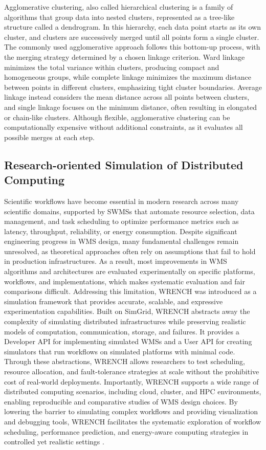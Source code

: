 Agglomerative clustering, also called hierarchical clustering is a family of algorithms that group data into nested clusters, represented as a tree-like structure called a dendrogram. In this hierarchy, each data point starts as its own cluster, and clusters are successively merged until all points form a single cluster. The commonly used agglomerative approach follows this bottom-up process, with the merging strategy determined by a chosen linkage criterion. Ward linkage minimizes the total variance within clusters, producing compact and homogeneous groups, while complete linkage minimizes the maximum distance between points in different clusters, emphasizing tight cluster boundaries. Average linkage instead considers the mean distance across all points between clusters, and single linkage focuses on the minimum distance, often resulting in elongated or chain-like clusters. Although flexible, agglomerative clustering can be computationally expensive without additional constraints, as it evaluates all possible merges at each step.

\subsection{Research-oriented Simulation of Distributed Computing}
\label{sec:background_simulation}

Scientific workflows have become essential in modern research across many scientific domains, supported by SWMSs that automate resource selection, data management, and task scheduling to optimize performance metrics such as latency, throughput, reliability, or energy consumption. Despite significant engineering progress in WMS design, many fundamental challenges remain unresolved, as theoretical approaches often rely on assumptions that fail to hold in production infrastructures. As a result, most improvements in WMS algorithms and architectures are evaluated experimentally on specific platforms, workflows, and implementations, which makes systematic evaluation and fair comparisons difficult. Addressing this limitation, WRENCH was introduced as a simulation framework that provides accurate, scalable, and expressive experimentation capabilities. Built on SimGrid, WRENCH abstracts away the complexity of simulating distributed infrastructures while preserving realistic models of computation, communication, storage, and failures. It provides a Developer API for implementing simulated WMSs and a User API for creating simulators that run workflows on simulated platforms with minimal code. Through these abstractions, WRENCH allows researchers to test scheduling, resource allocation, and fault-tolerance strategies at scale without the prohibitive cost of real-world deployments. Importantly, WRENCH supports a wide range of distributed computing scenarios, including cloud, cluster, and HPC environments, enabling reproducible and comparative studies of WMS design choices. By lowering the barrier to simulating complex workflows and providing visualization and debugging tools, WRENCH facilitates the systematic exploration of workflow scheduling, performance prediction, and energy-aware computing strategies in controlled yet realistic settings \cite{wrench}.

